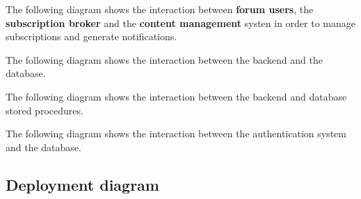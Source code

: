 \documentclass[12pt]{report}
\renewcommand\emph{\textbf}
\begin{document}
                The following diagram shows the interaction between \emph{forum users}, the \emph{subscription broker} and the \emph{content management} systen in order to manage subscriptions and generate notifications.


                \newpage

                The following diagram shows the interaction between the backend and the database.


                \newpage

                The following diagram shows the interaction between the backend and database stored procedures.


                \newpage

                The following diagram shows the interaction between the authentication system and the database.


                \newpage

                \newpage

            \subsection{Deployment diagram}
\end{document}
